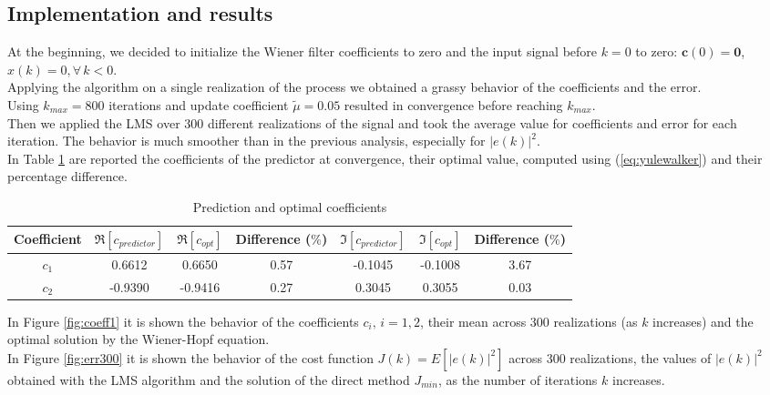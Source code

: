 \documentclass[a4paper, 12pt]{report}
\begin{document}
\subsection*{Implementation and results}
At the beginning, we decided to initialize the Wiener filter coefficients to zero and the input signal before $k=0$ to zero: $\mathbf{c}(0) = \mathbf{0}$, $x(k) = 0, \forall \, k<0$. \\
Applying the algorithm on a single realization of the process we obtained a grassy behavior of the coefficients and the error.\\
Using $k_{max} = 800$ iterations and update coefficient $\tilde{\mu} = 0.05$ resulted in convergence before reaching $k_{max}$.\\
Then we applied the LMS over 300 different realizations of the signal and took the average value for coefficients and error for each iteration. The behavior is much smoother than in the previous analysis, especially for $|e(k)|^2$.\\
In Table \ref{tab:predopt} are reported the coefficients of the predictor at convergence, their optimal value, computed using (\ref{eq:yulewalker}) and their percentage difference.

\begin{table}[H]
	\centering
	\begin{tabular}{c|cc|c|cc|c}
	\toprule
	Coefficient	& $\Re[c_{predictor}]$ 	& $\Re[c_{opt}]$	& Difference ($\%$)	& $\Im[c_{predictor}]$	& $\Im[c_{opt}]$ & Difference ($\%$) \\
	\midrule
	$c_1$ 	& 0.6612	& 0.6650			& 0.57 & -0.1045		& -0.1008 & 3.67 \\
	$c_2$	& -0.9390	& -0.9416			& 0.27 & 0.3045		& 0.3055 & 0.03 \\
	\bottomrule
	\end{tabular}
	\caption{Prediction and optimal coefficients}
	\label{tab:predopt}
\end{table}

In Figure \ref{fig:coeff1} it is shown the behavior of the coefficients $c_i, \, i=1,2$,  their mean across 300 realizations (as $k$ increases) and the optimal solution by the Wiener-Hopf equation.\\
In Figure \ref{fig:err300} it is shown the behavior of the cost function $J(k) = E \left[ |e(k)|^2 \right]$  across 300 realizations, the values of $|e(k)|^2$ obtained with the LMS algorithm and the solution of the direct method $J_{min}$, as the number of iterations $k$ increases.
\end{document}
